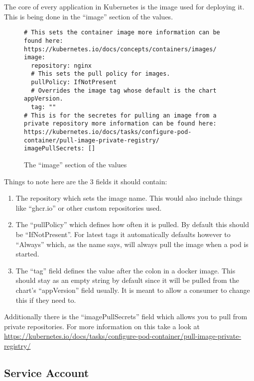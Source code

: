 \documentclass[english]{scrbook}
\begin{document}
The core of every application in Kubernetes is the image used for deploying it.
This is being done in the \enquote{image} section of the  \gls{values}.

\begin{figure}[!hp]
\centering
\begin{singlespace}
\begin{verbatim}
# This sets the container image more information can be found here: https://kubernetes.io/docs/concepts/containers/images/
image:
  repository: nginx
  # This sets the pull policy for images.
  pullPolicy: IfNotPresent
  # Overrides the image tag whose default is the chart appVersion.
  tag: ""
# This is for the secretes for pulling an image from a private repository more information can be found here: https://kubernetes.io/docs/tasks/configure-pod-container/pull-image-private-registry/
imagePullSecrets: []
\end{verbatim}
\end{singlespace}
\caption{The \enquote{image} section of the \gls{values}}\label{code:image_section}
\end{figure}

Things to note here are the 3 fields it should contain:

\begin{enumerate}
	\item The repository which sets the image name. This would also include things like \enquote{ghcr.io} or other custom repositories used.
	\item The \enquote{pullPolicy} which defines how often it is pulled. By default this should be \enquote{IfNotPresent}. For latest tags it automatically defaults however to \enquote{Always} which, as the name says, will always pull the image when a pod is started.
	\item The \enquote{tag} field defines the value after the colon in a docker image. This should stay as an empty string by default since it will be pulled from the chart's \enquote{appVersion} field usually. It is meant to allow a consumer to change this if they need to.
\end{enumerate}

Additionally there is the \enquote{imagePullSecrets} field which allows you to pull from private repositories. For more information on this take a look at \url{https://kubernetes.io/docs/tasks/configure-pod-container/pull-image-private-registry/}

\subsection{Service Account}
\end{document}
